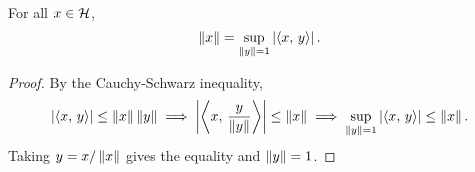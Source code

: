 \begin{proposition}\label{prop:inp_norm}
    For all $x\in\H$, 
    \begin{equation*}
        \norm{x} = \sup_{\norm{y} = 1}\abs{\inp{x}{y}}.
    \end{equation*}
\end{proposition}
\begin{proof}
    By the Cauchy-Schwarz inequality, 
    \begin{equation*}
        \abs{\inp{x}{y}} \leq \norm{x}\norm{y} 
        \implies \abs{\inp{x}{\frac{y}{\norm{y}}}} \leq \norm{x}
        \implies \sup_{\norm{y} = 1}\abs{\inp{x}{y}} \leq \norm{x}.
    \end{equation*}
    Taking $y = x/\norm{x}$ gives the equality and $\norm{y} = 1$.
\end{proof}

